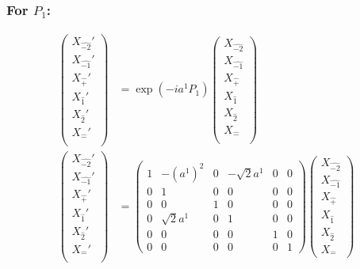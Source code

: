 \documentclass[]{article}
\numberwithin{equation}{section}
\begin{document}
{{\subsubsection{For $P_{1}$:}
\begin{align}
\begin{pmatrix}
    {X}_{\hat{-2}}'\\
    {X}_{\hat{-1}}'\\
    {X}_{\hat{+}}'\\
    {X}_{\hat{1}}'\\
    {X}_{\hat{2}}'\\
    {X}_{\hat{-}}'\\
    \end{pmatrix}&= \exp{(-ia^{1} P_{1})}\begin{pmatrix}
    {X}_{\hat{-2}}\\
    {X}_{\hat{-1}}\\
    {X}_{\hat{+}}\\
    {X}_{\hat{1}}\\
    {X}_{\hat{2}}\\
    {X}_{\hat{-}}\\
    \end{pmatrix}\\
    \begin{pmatrix}
    {X}_{\hat{-2}}'\\
    {X}_{\hat{-1}}'\\
    {X}_{\hat{+}}'\\
    {X}_{\hat{1}}'\\
    {X}_{\hat{2}}'\\
    {X}_{\hat{-}}'\\
    \end{pmatrix}&= \begin{pmatrix}
        1&-(a^{1})^{2}&0&-\sqrt{2}a^{1}&0&0\\
        0&1&0&0&0&0\\
        0&0&1&0&0&0\\
        0&\sqrt{2}a^{1}&0&1&0&0\\
        0&0&0&0&1&0\\
        0&0&0&0&0&1
    \end{pmatrix}\begin{pmatrix}
    {X}_{\hat{-2}}\\
    {X}_{\hat{-1}}\\
    {X}_{\hat{+}}\\
    {X}_{\hat{1}}\\
    {X}_{\hat{2}}\\
    {X}_{\hat{-}}

\end{pmatrix}
\end{align}}}
\end{document}
